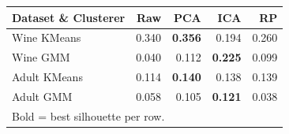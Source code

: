 \begin{tabular}{lrrrr}
\toprule
Dataset \& Clusterer & Raw & PCA & ICA & RP \\
\midrule
Wine KMeans & 0.340 & \textbf{0.356} & 0.194 & 0.260 \\
Wine GMM & 0.040 & 0.112 & \textbf{0.225} & 0.099 \\
Adult KMeans & 0.114 & \textbf{0.140} & 0.138 & 0.139 \\
Adult GMM & 0.058 & 0.105 & \textbf{0.121} & 0.038 \\
\multicolumn{5}{l}{\footnotesize Bold = best silhouette per row.} \\
\bottomrule
\end{tabular}

